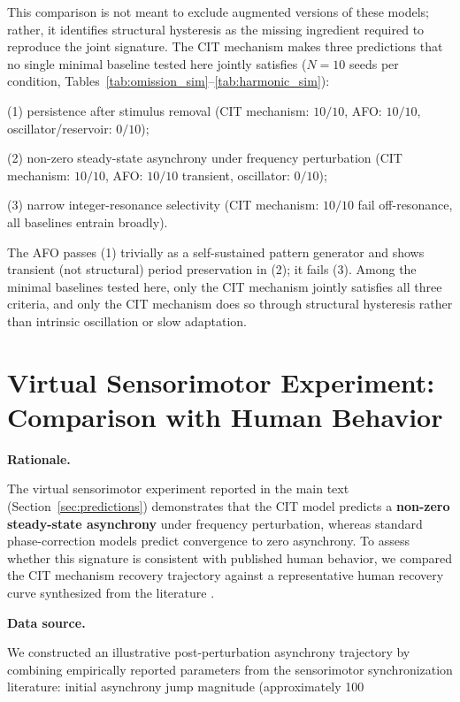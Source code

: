 \documentclass[12pt,a4paper]{article}
\begin{document}
This comparison is not meant to exclude augmented versions of these models; rather, it identifies structural hysteresis as the missing ingredient required to reproduce the joint signature. The CIT mechanism makes three predictions that no single minimal baseline tested here jointly satisfies ($N=10$ seeds per condition, Tables~\ref{tab:omission_sim}--\ref{tab:harmonic_sim}):

(1) persistence after stimulus removal (CIT mechanism: $10/10$, AFO: $10/10$, oscillator/reservoir: $0/10$);

(2) non-zero steady-state asynchrony under frequency perturbation (CIT mechanism: $10/10$, AFO: $10/10$ transient, oscillator: $0/10$);

(3) narrow integer-resonance selectivity (CIT mechanism: $10/10$ fail off-resonance, all baselines entrain broadly).

The AFO passes (1) trivially as a self-sustained pattern generator and shows transient (not structural) period preservation in (2); it fails (3). Among the minimal baselines tested here, only the CIT mechanism jointly satisfies all three criteria, and only the CIT mechanism does so through structural hysteresis rather than intrinsic oscillation or slow adaptation.



\section{Virtual Sensorimotor Experiment: Comparison with Human Behavior}
\label{sec:human_comparison}




\textbf{Rationale.}

The virtual sensorimotor experiment reported in the main text (Section~\ref{sec:predictions}) demonstrates that the CIT model predicts a \textbf{non-zero steady-state asynchrony} under frequency perturbation, whereas standard phase-correction models predict convergence to zero asynchrony. To assess whether this signature is consistent with published human behavior, we compared the CIT mechanism recovery trajectory against a representative human recovery curve synthesized from the literature \cite{repp2005sensorimotor, repp2013sensorimotor}.



\textbf{Data source.}

We constructed an illustrative post-perturbation asynchrony trajectory by combining empirically reported parameters from the sensorimotor synchronization literature: initial asynchrony jump magnitude (approximately 100%
\end{document}
